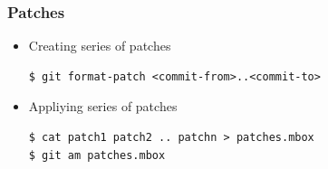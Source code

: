 \begin{frame}[fragile]
  \frametitle{Patches}

  \begin{itemize}
  \item Creating series of patches
    {\scriptsize
\begin{verbatim}
$ git format-patch <commit-from>..<commit-to>
\end{verbatim}
    }

  \item Appliying series of patches
    {\scriptsize
\begin{verbatim}
$ cat patch1 patch2 .. patchn > patches.mbox
$ git am patches.mbox
\end{verbatim}
    }
    \end{itemize}

\end{frame}


